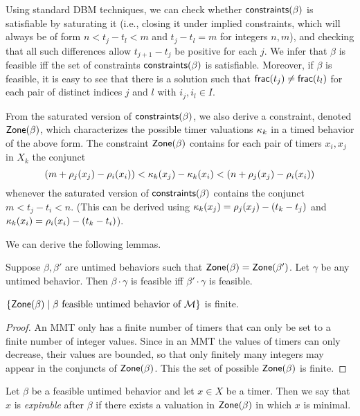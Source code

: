 Using standard DBM techniques, we can check whether $\mathsf{constraints}({\beta})$ is satisfiable by saturating it (i.e., closing it under implied constraints, which
will always be of form
$n < t_j - t_l < m$ and $t_j - t_l = m$ for integers $n,m$), and checking that
all such differences allow $t_{j+1} - t_j$ be positive for each $j$.
We infer that $\beta$ is feasible iff the set of constraints $\mathsf{constraints}({\beta})$ is satisfiable.
Moreover, if $\beta$ is feasible, it is easy to see that there is a solution
such that $\mathsf{frac}({t_j}) \neq \mathsf{frac}({t_l})$ for each pair of distinct indices $j$ and $l$ with $i_j, i_l \in I$.

From the saturated version of $\mathsf{constraints}({\beta})$, we also derive a constraint,
denoted $\mathsf{Zone}({\beta})$,
which characterizes the possible timer valuations $\kappa_k$ in a timed
behavior of the above form.  The constraint $\mathsf{Zone}({\beta})$
contains for each pair of timers $x_i,x_j$ in $X_k$ the conjunct
\[
(m + \rho_j(x_j) - \rho_i(x_i)) < \kappa_k(x_j) -\kappa_k(x_i) < (n + \rho_j(x_j) - \rho_i(x_i))
\]
whenever the saturated version of $\mathsf{constraints}({\beta})$ contains the conjunct
\(
m < t_j - t_i < n
\).
(This can be derived using
$\kappa_k(x_j) = \rho_j(x_j) - (t_k - t_j)$
and
$\kappa_k(x_i) = \rho_i(x_i) - (t_k - t_i)$).

We can derive the following lemmas.

\begin{lemma}
\label{lemma: feasibility concatenation}
Suppose $\beta, \beta'$ are untimed behaviors such that
$\mathsf{Zone}({\beta}) = \mathsf{Zone}({\beta'})$. Let $\gamma$ be any untimed behavior.
Then $\beta \cdot \gamma$ is feasible iff $\beta' \cdot \gamma$ is feasible.
\end{lemma}

\begin{lemma}
\label{lemma finitely many zones}
$\{ \mathsf{Zone}({\beta}) \mid \beta \mbox{ feasible untimed behavior of } {\mathcal M} \}$ is finite.
\end{lemma}
\begin{proof}
  An MMT only has a finite number of timers that can only be set to a finite number of integer values. Since in an MMT the values of timers can only decrease, their values are bounded, so that only finitely many integers may appear in the conjuncts of $\mathsf{Zone}({\beta})$. This the set of possible $\mathsf{Zone}({\beta})$ is finite.
\end{proof}

Let $\beta$ be a feasible untimed behavior and let $x \in X$ be a timer. Then we say that $x$ is \emph{expirable} after $\beta$
if there exists a valuation in $\mathsf{Zone}({\beta})$ in which $x$ is minimal.

